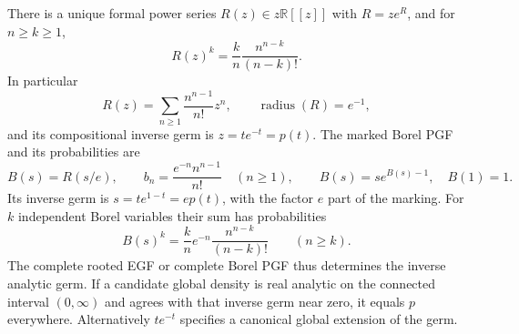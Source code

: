 \begin{theorem}
\label{final:P6}
There is a unique formal power series $R(z)\in z\mathbb R[[z]]$
with $R=ze^R$, and for $n\geq k\geq1$,
\begin{equation}
 [z^n]R(z)^k=\frac{k}{n}\frac{n^{n-k}}{(n-k)!}.
 \label{final:eq-rooted-coefficients}
\end{equation}
In particular
\[
 R(z)=\sum_{n\geq1}\frac{n^{n-1}}{n!}z^n,
 \qquad \operatorname{radius}(R)=e^{-1},
\]
and its compositional inverse germ is $z=t e^{-t}=p(t)$.
The marked Borel PGF and its probabilities are
\begin{equation}
 B(s)=R(s/e),\qquad
 b_n=\frac{e^{-n}n^{n-1}}{n!}\quad(n\geq1),\qquad
 B(s)=s e^{B(s)-1},\quad B(1)=1.
 \label{final:eq-borel}
\end{equation}
Its inverse germ is $s=t e^{1-t}=e p(t)$, with the factor $e$
part of the marking.  For $k$ independent Borel variables their
sum has probabilities
\begin{equation}
 [s^n]B(s)^k=
 \frac{k}{n}e^{-n}\frac{n^{n-k}}{(n-k)!}\qquad(n\geq k).
 \label{final:eq-borel-forest}
\end{equation}
The complete rooted EGF or complete Borel PGF thus determines the
inverse analytic germ.  If a candidate global density is real
analytic on the connected interval $(0,\infty)$ and agrees with
that inverse germ near zero, it equals $p$ everywhere.  Alternatively
$t e^{-t}$ specifies a canonical global extension of the germ.
\end{theorem}
